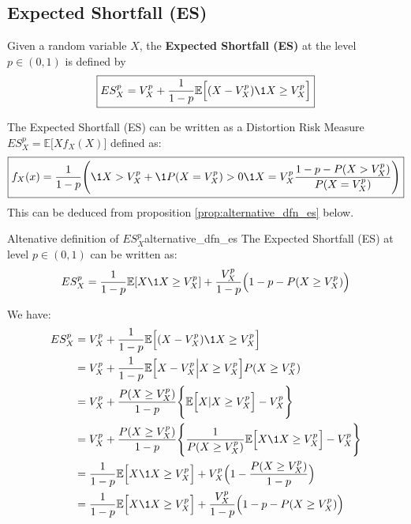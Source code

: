 \subsection{Expected Shortfall (ES)}
\begin{definition}
    Given a random variable $X$, the \textbf{Expected Shortfall (ES)} at the level $p \in (0,1)$ is defined by
    \begin{align*}
        \boxed{
            ES_X^p = V_X^p + \frac{1}{1-p} \mathbb{E}\Big[ 
                (X - V_X^p)\1{X\ge V_X^p}
            \Big]
        }
    \end{align*}

    \noindent The Expected Shortfall (ES) can be written as a Distortion Risk Measure $ES_X^p=\mathbb{E}\Big[ Xf_X(X) \Big]$ defined as:
    \begin{align*}
        \boxed{
            f_X(x) = \frac{1}{1-p}\Bigg( 
                \1{X > V_X^p} + \1{P(X=V_X^p) > 0}\1{X=V_X^p}\frac{1-p-P(X>V_X^p)}{P(X=V_X^p)}
            \Bigg)
        }   
    \end{align*}
    \noindent\newline This can be deduced from proposition \ref{prop:alternative_dfn_es} below.
\end{definition}

\begin{proposition}{Altenative definition of $ES_X^p$}{alternative_dfn_es}
    The Expected Shortfall (ES) at level $p\in(0,1)$ can be written as:
    \begin{align*}
        ES_X^p = \frac{1}{1-p}\mathbb{E}[X\1{X\ge V_X^p}] + \frac{V_X^p}{1-p}\Big(1-p-P(X\ge V_X^p)\Big)
    \end{align*}
\end{proposition}

\begin{proof*}
    We have:
    \begin{align*}
        ES_X^p 
            &= V_X^p + \frac{1}{1-p}\mathbb{E}\Big[ (X - V_X^p)\1{X\ge V_X^p} \Big] \\
            &= V_X^p + \frac{1}{1-p}\mathbb{E}\Big[X-V_X^p \Big| X\ge V_X^p \Big] P(X\ge V_X^p) \\
            &= V_X^p + \frac{P(X\ge V_X^p)}{1-p}\Bigg\{ \mathbb{E}\Big[ X| X \ge V_X^p \Big] - V_X^p \Bigg\} \\
            &= V_X^p + \frac{P(X\ge V_X^p)}{1-p}\Bigg\{ \frac{1}{P(X\ge V_X^p)} \mathbb{E}\Big[ X\1{X\ge V_X^p} \Big] - V_X^p \Bigg\} \\
            &= \frac{1}{1-p}\mathbb{E}\Big[ X\1{X\ge V_X^p} \Big] + V_X^p \Big( 1 - \frac{P(X\ge V_X^p)}{1-p} \Big) \\
            &= \frac{1}{1-p}\mathbb{E}\Big[ X\1{X\ge V_X^p} \Big] + \frac{V_X^p}{1-p}\Big( 1 - p - P(X\ge V_X^p) \Big)
    \end{align*}
\end{proof*}

